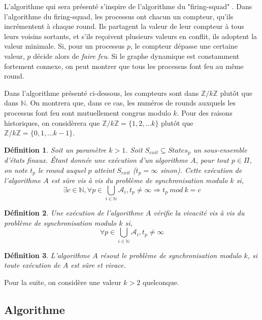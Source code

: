 \documentclass{article}
\newtheorem{definition}{Définition}
\begin{document}
L'algorithme qui sera présenté s'inspire de l'algorithme du "firing-squad" \cite{firing_squad}.
Dans l'algorithme du firing-squad, les processus ont chacun un compteur, qu'ils incrémentent à chaque round. Ils partagent la valeur de leur compteur à tous leurs voisins sortants, 
et s'ils reçoivent plusieurs valeurs en conflit, ils adoptent la valeur minimale.
Si, pour un processus $p$, le compteur dépasse une certaine valeur, $p$ décide alors de \emph{faire feu}.
Si le graphe dynamique est constamment fortement connexe, on peut montrer que tous les processus font feu au même round.

Dans l'algorithme présenté ci-dessous, les compteurs sont dans $\mathds{Z}/k\mathds{Z}$ plutôt que dans $\mathds{N}$.
On montrera que, dans ce cas, les numéros de rounds auxquels les processus font feu sont mutuellement congrus modulo $k$.
Pour des raisons historiques, on considèrera que $\mathds{Z}/k\mathds{Z} = \{1, 2, ... k\}$ plutôt que $\mathds{Z}/k\mathds{Z} = \{0, 1, ... k-1\}$.

\begin{definition}

	Soit un paramètre $k > 1$. Soit $S_{exit} \subseteq States_p$ un sous-ensemble d'états finaux.
	Étant donnée une exécution d'un algorithme $A$, pour tout $p \in \Pi$, on note $t_p$ le round auquel $p$ atteint $S_{exit}$ ($t_p = \infty$ sinon).
	Cette exécution de l'algorithme $A$ est sûre vis à vis du problème de synchronisation modulo $k$ si,
	$$\exists c \in \mathds{N}, \forall p \in \bigcup\limits_{i \in \mathds{N}} \mathcal{A}_i, t_p \neq \infty \Rightarrow t_p~mod~k = c$$

\end{definition}

\begin{definition}

	Une exécution de l'algorithme $A$ vérifie la vivacité vis à vis du problème de synchronisation modulo $k$ si,
	$$\forall p \in \bigcup\limits_{i \in \mathds{N}} \mathcal{A}_i, t_p \neq \infty$$

\end{definition}
\begin{definition}
	L'algorithme $A$ résout le problème de synchronisation modulo $k$, si toute exécution de $A$ est sûre et vivace.
\end{definition}

Pour la suite, on considère une valeur $k > 2$ quelconque.

\subsection{Algorithme}
\end{document}
